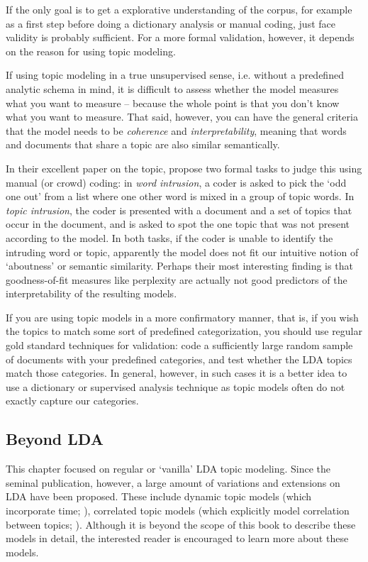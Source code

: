 If the only goal is to get a explorative understanding of the corpus,
for example as a first step before doing a dictionary analysis or manual coding,
just face validity is probably sufficient.
For a more formal validation, however, it depends on the reason for using topic modeling.

If using topic modeling in a true unsupervised sense, i.e. without a predefined analytic schema in mind,
it is difficult to assess whether the model measures what you want to measure --
because the whole point is that you don't know what you want to measure.
That said, however, you can have the general criteria that the model needs to be \emph{coherence}
and \emph{interpretability}, meaning that words and documents that share a topic
are also similar semantically. 

In their excellent paper on the topic, \citet{chang09} propose two formal tasks to judge this
using manual (or crowd) coding: in \emph{word intrusion}, a coder is asked to pick the `odd one out' from a list
where one other word is mixed in a group of topic words.
In \emph{topic intrusion}, the coder is presented with a document and a set of topics that occur in the document,
and is asked to spot the one topic that was not present according to the model.
In both tasks, if the coder is unable to identify the intruding word or topic, apparently the model does not fit
our intuitive notion of `aboutness' or semantic similarity.
Perhaps their most interesting finding is that goodness-of-fit measures like perplexity
are actually not good predictors of the interpretability of the resulting models.

If you are using topic models in a more confirmatory manner,
that is, if you wish the topics to match some sort of predefined categorization,
you should use regular gold standard techniques for validation:
code a sufficiently large random sample of documents with your predefined categories,
and test whether the LDA topics match those categories.
In general, however, in such cases it is a better idea to use a dictionary or supervised analysis technique
as topic models often do not exactly capture our categories.


\subsection{Beyond LDA}

This chapter focused on regular or `vanilla' LDA topic modeling.
Since the seminal publication, however, a large amount of variations and extensions on LDA have been proposed.
These include dynamic topic models (which incorporate time; \cite*{dynamiclda}),
correlated topic models (which explicitly model correlation between topics; \cite{correlatedlda}).
Although it is beyond the scope of this book to describe these models in detail,
the interested reader is encouraged to learn more about these models.


